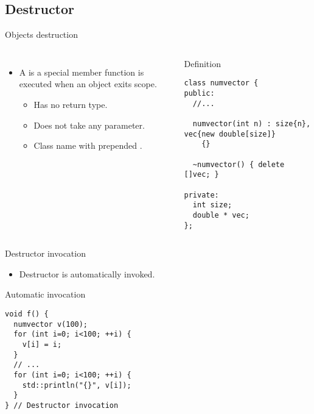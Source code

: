 \subsection{Destructor}

\begin{frame}[t,fragile]{Objects destruction}
\begin{columns}[T]

\begin{itemize}
  \item A  is a special member function is executed
         when an object exits scope.
    \begin{itemize}
      \item Has no return type.
      \item Does not take any parameter.
      \item Class name with prepended \textbf{\cppid{\~}}.
    \end{itemize}
\end{itemize}


\begin{block}{Definition}
\begin{lstlisting}
class numvector {
public:
  //...

  numvector(int n) : size{n}, vec{new double[size]}
    {}

  ~numvector() { delete []vec; }

private:
  int size;
  double * vec;
};
\end{lstlisting}
\end{block}

\end{columns}
\end{frame}

\begin{frame}[t,fragile]{Destructor invocation}
\begin{itemize}
  \item Destructor is automatically invoked.
\end{itemize}

\begin{block}{Automatic invocation}
\begin{lstlisting}
void f() {
  numvector v(100);
  for (int i=0; i<100; ++i) {
    v[i] = i;
  }
  // ...
  for (int i=0; i<100; ++i) {
    std::println("{}", v[i]);
  }
} // Destructor invocation
\end{lstlisting}
\end{block}
\end{frame}
